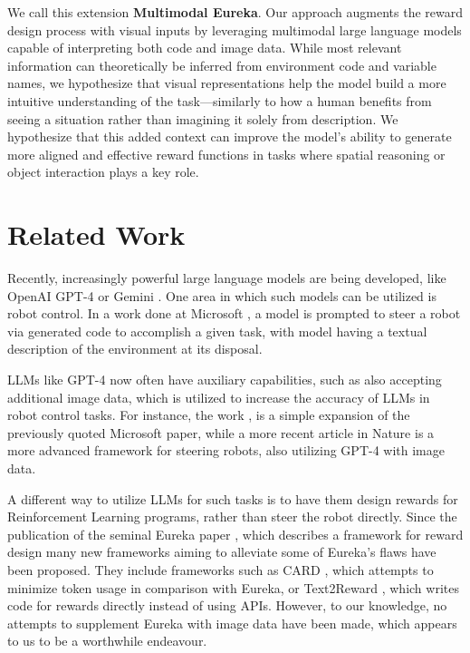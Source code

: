 \documentclass[10pt,twocolumn]{article}
\begin{document}
We call this extension \textbf{Multimodal Eureka}. Our approach augments the reward design process with visual inputs by leveraging multimodal large language models capable of interpreting both code and image data. While most relevant information can theoretically be inferred from environment code and variable names, we hypothesize that visual representations help the model build a more intuitive understanding of the task—similarly to how a human benefits from seeing a situation rather than imagining it solely from description. We hypothesize that this added context can improve the model’s ability to generate more aligned and effective reward functions in tasks where spatial reasoning or object interaction plays a key role.


\section{Related Work}
Recently, increasingly powerful large language models are being developed, like OpenAI GPT-4 \cite{GPT-4} or Gemini \cite{Gemini}. One area in which such models can be utilized is robot control. In a work done at Microsoft \cite{Microsoft}, a model is prompted to steer a robot via generated code to accomplish a given task, with model having a textual description of the environment at its disposal. 

LLMs like GPT-4 now often have auxiliary capabilities, such as also accepting additional image data, which is utilized to increase the accuracy of LLMs in robot control tasks. For instance, the work \cite{TUDelft}, is a simple expansion of the previously quoted Microsoft paper, while a more recent article in Nature \cite{Nature} is a more advanced framework for steering robots, also utilizing GPT-4 with image data.

A different way to utilize LLMs for such tasks is to have them design rewards for Reinforcement Learning programs, rather than steer the robot directly. Since the publication of the seminal Eureka paper \cite{eureka}, which describes a framework for reward design many new frameworks aiming to alleviate some of Eureka's flaws have been proposed. They include frameworks such as CARD \cite{card}, which attempts to minimize token usage in comparison with Eureka, or Text2Reward \cite{Text2Reward}, which writes code for rewards directly instead of using APIs. However, to our knowledge, no attempts to supplement Eureka with image data have been made, which appears to us to be a worthwhile endeavour. 
\end{document}

